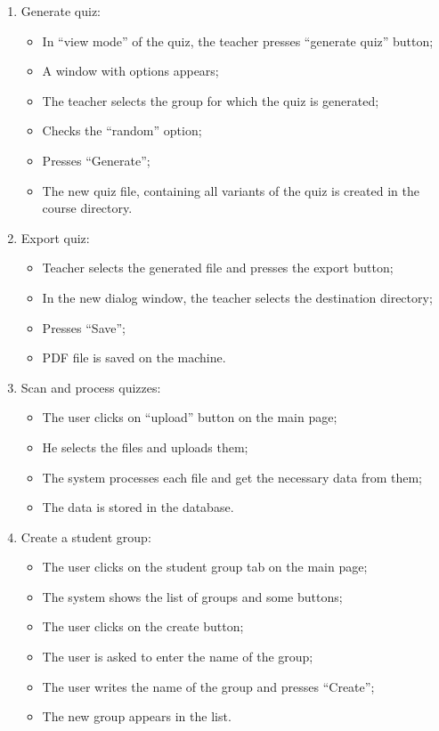 \begin{enumerate}
  \item Generate quiz:
  \begin{itemize}
    \item In “view mode” of the quiz, the teacher presses “generate quiz” button;
    \item A window with options appears;
    \item The teacher selects the group for which the quiz is generated;
    \item Checks the “random” option;
    \item Presses “Generate”;
    \item The new quiz file, containing all variants of the quiz is created in the course directory.
  \end{itemize}

  \item Export quiz:
  \begin{itemize}
    \item Teacher selects the generated file and presses the export button;
    \item In the new dialog window, the teacher selects the destination directory;
    \item Presses “Save”;
    \item PDF file is saved on the machine.
  \end{itemize}

  \item Scan and process quizzes:
  \begin{itemize}
    \item The user clicks on “upload” button on the main page;
    \item He selects the files and uploads them;
    \item The system processes each file and get the necessary data from them;
    \item The data is stored in the database.
  \end{itemize}

  \item Create a student group:
  \begin{itemize}
    \item The user clicks on the student group tab on the main page;
    \item The system shows the list of groups and some buttons;
    \item The user clicks on the create button;
    \item The user is asked to enter the name of the group;
    \item The user writes the name of the group and presses “Create”;
    \item The new group appears in the list.
  \end{itemize}


\end{enumerate}
